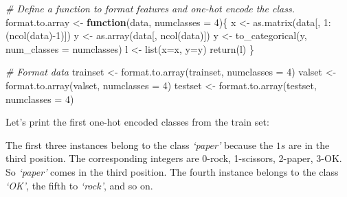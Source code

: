 \documentclass[
  11pt,
]{krantz}
\newenvironment{Shaded}{\begin{snugshade}}{\end{snugshade}}
\newcommand{\AttributeTok}[1]{\textcolor[rgb]{0.61,0.61,0.61}{#1}}
\newcommand{\CommentTok}[1]{\textcolor[rgb]{0.37,0.37,0.37}{\textit{#1}}}
\newcommand{\ControlFlowTok}[1]{\textcolor[rgb]{0.27,0.27,0.27}{\textbf{#1}}}
\newcommand{\DecValTok}[1]{\textcolor[rgb]{0.06,0.06,0.06}{#1}}
\newcommand{\FunctionTok}[1]{\textcolor[rgb]{0,0,0}{#1}}
\newcommand{\NormalTok}[1]{#1}
\newcommand{\OtherTok}[1]{\textcolor[rgb]{0.37,0.37,0.37}{#1}}
\newcommand{\SpecialCharTok}[1]{\textcolor[rgb]{0,0,0}{#1}}
\begin{document}
\begin{Shaded}
\begin{Highlighting}[]
\CommentTok{\# Define a function to format features and one{-}hot encode the class.}
\NormalTok{format.to.array }\OtherTok{\textless{}{-}} \ControlFlowTok{function}\NormalTok{(data, }\AttributeTok{numclasses =} \DecValTok{4}\NormalTok{)\{}
\NormalTok{  x }\OtherTok{\textless{}{-}} \FunctionTok{as.matrix}\NormalTok{(data[, }\DecValTok{1}\SpecialCharTok{:}\NormalTok{(}\FunctionTok{ncol}\NormalTok{(data)}\SpecialCharTok{{-}}\DecValTok{1}\NormalTok{)])}
\NormalTok{  y }\OtherTok{\textless{}{-}} \FunctionTok{as.array}\NormalTok{(data[, }\FunctionTok{ncol}\NormalTok{(data)])}
\NormalTok{  y }\OtherTok{\textless{}{-}} \FunctionTok{to\_categorical}\NormalTok{(y, }\AttributeTok{num\_classes =}\NormalTok{ numclasses)}
\NormalTok{  l }\OtherTok{\textless{}{-}} \FunctionTok{list}\NormalTok{(}\AttributeTok{x=}\NormalTok{x, }\AttributeTok{y=}\NormalTok{y)}
  \FunctionTok{return}\NormalTok{(l)}
\NormalTok{\}}

\CommentTok{\# Format data}
\NormalTok{trainset }\OtherTok{\textless{}{-}} \FunctionTok{format.to.array}\NormalTok{(trainset, }\AttributeTok{numclasses =} \DecValTok{4}\NormalTok{)}
\NormalTok{valset }\OtherTok{\textless{}{-}} \FunctionTok{format.to.array}\NormalTok{(valset, }\AttributeTok{numclasses =} \DecValTok{4}\NormalTok{)}
\NormalTok{testset }\OtherTok{\textless{}{-}} \FunctionTok{format.to.array}\NormalTok{(testset, }\AttributeTok{numclasses =} \DecValTok{4}\NormalTok{)}
\end{Highlighting}
\end{Shaded}

Let's print the first one-hot encoded classes from the train set:

\begin{Shaded}
\end{Shaded}

The first three instances belong to the class \emph{`paper'} because the \(1s\) are in the third position. The corresponding integers are 0-rock, 1-scissors, 2-paper, 3-OK. So \emph{`paper'} comes in the third position. The fourth instance belongs to the class \emph{`OK'}, the fifth to \emph{`rock'}, and so on.
\end{document}

